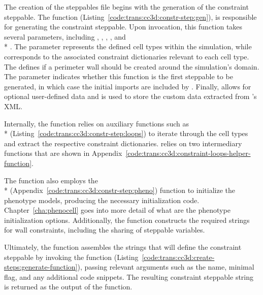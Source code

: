The creation of the steppables file begins with the generation of the constraint steppable. The function  (Listing~\ref{code:trans:cc3d:constr-step:gen}), is responsible for generating the constraint steppable. Upon invocation, this function takes several parameters, including , , , , and\\* . The  parameter represents the defined cell types within the simulation, while  corresponds to the associated constraint dictionaries relevant to each cell type. The  defines if a perimeter wall should be created around the simulation's domain. The  parameter indicates whether this function is the first steppable to be generated, in which case  the initial imports are included by . Finally,  allows for optional user-defined data and is used to store the custom data extracted from \psc's XML. %


Internally, the function relies on auxiliary functions such as \\* (Listing~\ref{code:trans:cc3d:constr-step:loops}) to iterate through the cell types and extract the respective constraint dictionaries.  relies on two intermediary functions that are shown in Appendix~\ref{code:trans:cc3d:constraint-loops-helper-function}. 

The function  also employs the \\* (Appendix~\ref{code:trans:cc3d:constr-step:pheno}) function to initialize the phenotype models, producing the necessary initialization code. Chapter~\ref{cha:phenocell} goes into more detail of what are the phenotype initialization options. Additionally, the function constructs the required strings for wall constraints, including the sharing of steppable variables.

Ultimately, the function assembles the strings that will define the constraint steppable by invoking the  function (Listing~\ref{code:trans:cc3d:create-steps:generate-function}), passing relevant arguments such as the name, minimal flag, and any additional code snippets. The resulting constraint steppable string is returned as the output of the function.

